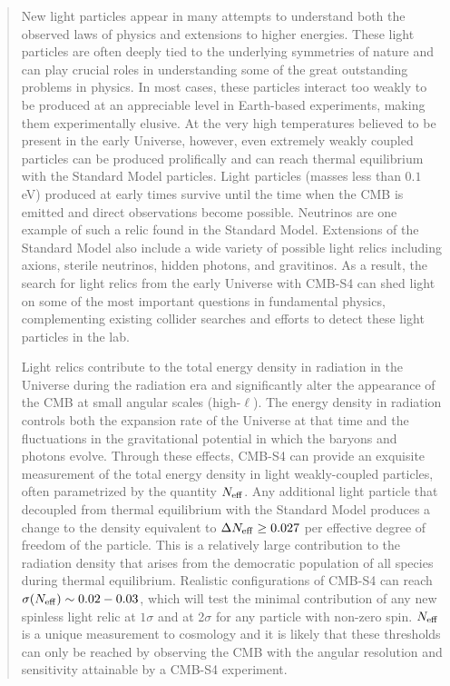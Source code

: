 \begin{quotation}

New light particles appear in many attempts to understand both the observed laws of physics and extensions to higher energies.  These light particles are often deeply tied to the underlying symmetries of nature and can play crucial roles in understanding some of the great outstanding problems in physics.  In most cases, these particles interact too weakly to be produced at an appreciable level in Earth-based experiments, making them experimentally elusive.  At the very high temperatures believed to be present in the early Universe, however, even extremely weakly coupled particles can be produced prolifically and can reach thermal equilibrium with the Standard Model particles. Light particles (masses less than $0.1$ eV) produced at early times survive until the time when the CMB is emitted and direct observations become possible.  Neutrinos are one example of such a relic found in the Standard Model.  Extensions of the Standard Model also include a wide variety of possible light relics including axions, sterile neutrinos, hidden photons, and gravitinos.  As a result, the search for light relics from the early Universe with CMB-S4 can shed light on some of the most important questions in fundamental physics, complementing existing collider searches and efforts to detect these light particles in the lab.  
 
Light relics contribute to the total energy density in radiation in the Universe during the radiation era and significantly alter the appearance of the CMB at small angular scales (high-$\ell$). The energy density in radiation controls both the expansion rate of the Universe at that time and the fluctuations in the gravitational potential in which the baryons and photons evolve.  Through these effects, CMB-S4 can provide an exquisite measurement of the total energy density in light weakly-coupled particles, often parametrized by the quantity $N_{\rm eff}$.  Any additional light particle that decoupled from thermal equilibrium with the Standard Model produces a change to the density equivalent to $\Delta N_{\rm eff} \geq 0.027$ per effective degree of freedom of the particle.  This is a relatively large contribution to the radiation density that arises from the democratic population of all species during thermal equilibrium.  Realistic configurations of CMB-S4 can reach $\sigma(N_{\rm eff}) \sim 0.02-0.03$, which will test the minimal contribution of any new spinless light relic at $1\sigma$ and at 2$\sigma$ for any particle with non-zero spin.  $N_{\rm eff}$ is a unique measurement to cosmology and it is likely that these thresholds can only be reached by observing the CMB with the angular resolution and sensitivity attainable by a CMB-S4 experiment.   

  
\end{quotation}
    
